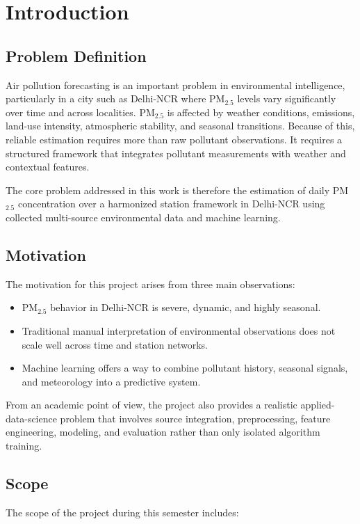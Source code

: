 \documentclass[12pt,a4paper]{report}
\begin{document}
\chapter{Introduction}

\section{Problem Definition}
Air pollution forecasting is an important problem in environmental intelligence, particularly in a city such as Delhi-NCR where PM$_{2.5}$ levels vary significantly over time and across localities. PM$_{2.5}$ is affected by weather conditions, emissions, land-use intensity, atmospheric stability, and seasonal transitions. Because of this, reliable estimation requires more than raw pollutant observations. It requires a structured framework that integrates pollutant measurements with weather and contextual features.

The core problem addressed in this work is therefore the estimation of daily PM$_{2.5}$ concentration over a harmonized station framework in Delhi-NCR using collected multi-source environmental data and machine learning.

\section{Motivation}
The motivation for this project arises from three main observations:

\begin{itemize}[leftmargin=1.3cm]
    \item PM$_{2.5}$ behavior in Delhi-NCR is severe, dynamic, and highly seasonal.
    \item Traditional manual interpretation of environmental observations does not scale well across time and station networks.
    \item Machine learning offers a way to combine pollutant history, seasonal signals, and meteorology into a predictive system.
\end{itemize}

From an academic point of view, the project also provides a realistic applied-data-science problem that involves source integration, preprocessing, feature engineering, modeling, and evaluation rather than only isolated algorithm training.

\section{Scope}
The scope of the project during this semester includes:
\end{document}

